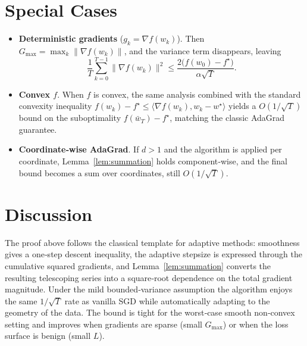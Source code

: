 \documentclass{article}
\begin{document}
\section*{Special Cases}
\begin{itemize}
\item \textbf{Deterministic gradients} ($g_k=\nabla f(w_k)$).  
Then $G_{\max}= \max_k\|\nabla f(w_k)\|$, and the variance term disappears, leaving
\[
\frac{1}{T}\sum_{k=0}^{T-1}\|\nabla f(w_k)\|^{2}
\le \frac{2\big(f(w_0)-f^{\star}\big)}{\alpha\sqrt{T}} .
\]

\item \textbf{Convex $f$}.  
When $f$ is convex, the same analysis combined with the standard convexity inequality
$f(w_k)-f^{\star}\le\langle\nabla f(w_k), w_k-w^{\star}\rangle$ yields a $O(1/\sqrt{T})$ bound on the suboptimality $f(\bar w_T)-f^{\star}$, matching the classic AdaGrad guarantee.

\item \textbf{Coordinate‑wise AdaGrad}.  
If $d>1$ and the algorithm is applied per coordinate, Lemma~\ref{lem:summation} holds component‑wise, and the final bound becomes a sum over coordinates, still $O(1/\sqrt{T})$.
\end{itemize}

\section*{Discussion}
The proof above follows the classical template for adaptive methods: smoothness gives a one‑step descent inequality, the adaptive stepsize is expressed through the cumulative squared gradients, and Lemma~\ref{lem:summation} converts the resulting telescoping series into a square‑root dependence on the total gradient magnitude. Under the mild bounded‑variance assumption the algorithm enjoys the same $1/\sqrt{T}$ rate as vanilla SGD while automatically adapting to the geometry of the data. The bound is tight for the worst‑case smooth non‑convex setting and improves when gradients are sparse (small $G_{\max}$) or when the loss surface is benign (small $L$).
\end{document}
